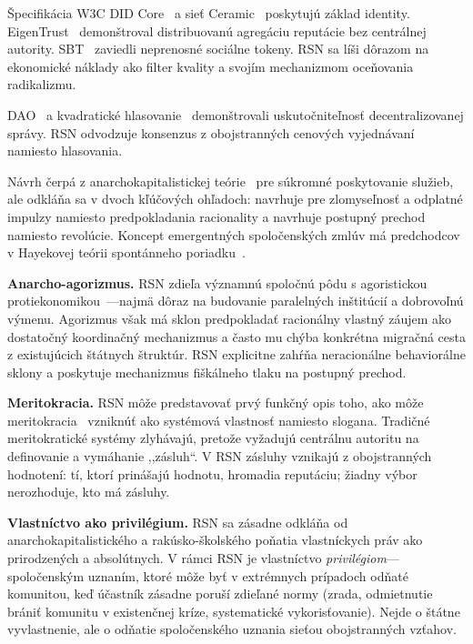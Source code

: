 \documentclass[11pt,a4paper,twocolumn]{article}
\begin{document}
Špecifikácia W3C DID Core~\cite{did2022} a sieť Ceramic~\cite{ceramic2023} poskytujú základ identity. EigenTrust~\cite{kamvar2003} demonštroval distribuovanú agregáciu reputácie bez centrálnej autority. SBT~\cite{weyl2022} zaviedli neprenosné sociálne tokeny. RSN sa líši dôrazom na ekonomické náklady ako filter kvality a svojím mechanizmom oceňovania radikalizmu.

DAO~\cite{buterin2014} a kvadratické hlasovanie~\cite{buterin2019} demonštrovali uskutočniteľnosť decentralizovanej správy. RSN odvodzuje konsenzus z obojstranných cenových vyjednávaní namiesto hlasovania.

Návrh čerpá z anarchokapitalistickej teórie~\cite{rothbard1973,hoppe2001} pre súkromné poskytovanie služieb, ale odkláňa sa v dvoch kľúčových ohľadoch: navrhuje pre zlomyseľnosť a odplatné impulzy namiesto predpokladania racionality a navrhuje postupný prechod namiesto revolúcie. Koncept emergentných spoločenských zmlúv má predchodcov v Hayekovej teórii spontánneho poriadku~\cite{hayek1973}.

\textbf{Anarcho-agorizmus.} RSN zdieľa významnú spoločnú pôdu s agoristickou protiekonomikou~\cite{konkin2006}---najmä dôraz na budovanie paralelných inštitúcií a dobrovoľnú výmenu. Agorizmus však má sklon predpokladať racionálny vlastný záujem ako dostatočný koordinačný mechanizmus a často mu chýba konkrétna migračná cesta z existujúcich štátnych štruktúr. RSN explicitne zahŕňa neracionálne behaviorálne sklony a poskytuje mechanizmus fiškálneho tlaku na postupný prechod.

\textbf{Meritokracia.} RSN môže predstavovať prvý funkčný opis toho, ako môže meritokracia~\cite{young1958} vzniknúť ako systémová vlastnosť namiesto slogana. Tradičné meritokratické systémy zlyhávajú, pretože vyžadujú centrálnu autoritu na definovanie a vymáhanie ,,zásluh``. V RSN zásluhy vznikajú z obojstranných hodnotení: tí, ktorí prinášajú hodnotu, hromadia reputáciu; žiadny výbor nerozhoduje, kto má zásluhy.

\textbf{Vlastníctvo ako privilégium.} RSN sa zásadne odkláňa od anarchokapitalistického a rakúsko-školského poňatia vlastníckych práv ako prirodzených a absolútnych. V rámci RSN je vlastníctvo \emph{privilégiom}---spoločenským uznaním, ktoré môže byť v extrémnych prípadoch odňaté komunitou, keď účastník zásadne poruší zdieľané normy (zrada, odmietnutie brániť komunitu v existenčnej kríze, systematické vykorisťovanie). Nejde o štátne vyvlastnenie, ale o odňatie spoločenského uznania sieťou obojstranných vzťahov.
\end{document}
